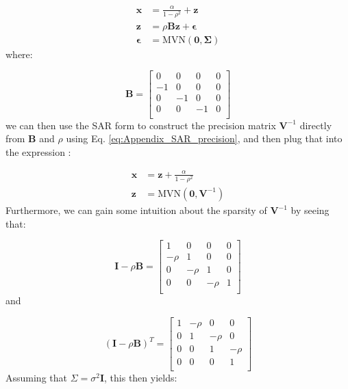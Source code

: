 \begin{equation}
\begin{aligned}
    \mathbf{x} &= \frac{\alpha}{1-\rho^2} + \mathbf{z} \\
    \mathbf{z} &= \rho \mathbf{Bz + \epsilon} \\
    \mathbf{\epsilon} &= \mathrm{MVN}( \mathbf{0, \Sigma} )
\end{aligned}
\end{equation}
where:

\begin{equation} 
    \mathbf{B} = \begin{bmatrix}
    0 & 0 & 0 & 0 \\
    -1 & 0 & 0 & 0 \\
    0 & -1 & 0 & 0 \\
    0 & 0 & -1 & 0 \\
    \end{bmatrix} 
\end{equation}
we can then use the SAR form to construct the precision matrix \( \mathbf{V}^{-1} \) directly from \( \mathbf{B} \) and \( \rho \) using Eq. \ref{eq:Appendix_SAR_precision}, and then plug that into the expression \cite{thorson_importance_2014}:

\begin{equation}
\begin{aligned}
    \mathbf{x} &= \mathbf{z} + \frac{\alpha}{1-\rho^2} \\
    \mathbf{z} &= \mathrm{MVN}( \mathbf{0, V}^{-1} )
\end{aligned}
\end{equation}
Furthermore, we can gain some intuition about the sparsity of \( \mathbf{V}^{-1} \) by seeing that:

\begin{equation} 
    \mathbf{I} - \rho \mathbf{B} = \begin{bmatrix}
    1 & 0 & 0 & 0 \\
    -\rho & 1 & 0 & 0 \\
    0 & -\rho & 1 & 0 \\
    0 & 0 & -\rho & 1 \\
    \end{bmatrix} 
\end{equation}
and

\begin{equation} 
    (\mathbf{I} - \rho \mathbf{B})^T = \begin{bmatrix}
    1 & -\rho & 0 & 0 \\
    0 & 1 & -\rho & 0 \\
    0 & 0 & 1 & -\rho \\
    0 & 0 & 0 & 1 \\
    \end{bmatrix} 
\end{equation}
Assuming that \( \Sigma = \sigma^2 \mathbf{I} \), this then yields:

